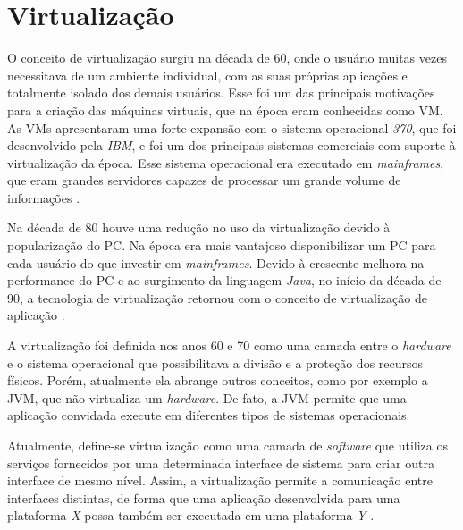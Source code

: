 \chapter{Virtualização}
\label{cap:virtualizacao}

O conceito de virtualização surgiu na década de 60, onde o usuário muitas vezes necessitava de um ambiente individual, com as suas próprias 
aplicações e totalmente isolado dos demais usuários. Esse foi um das principais motivações para a criação das máquinas virtuais, que na época 
eram conhecidas como \ac{VM}. As \acp{VM} apresentaram uma forte expansão com o sistema operacional \textit{370}, que foi 
desenvolvido pela \textit{IBM}, e foi um dos principais sistemas comerciais com suporte à virtualização da época. Esse sistema operacional 
era executado em \textit{mainframes}, que eram grandes servidores capazes de processar um grande volume de informações \cite{laureano2008}. 

Na década de 80 houve uma redução no uso da virtualização devido à popularização do \ac{PC}. Na época era mais vantajoso disponibilizar 
um \ac{PC} para cada usuário do que investir em \textit{mainframes}. Devido à crescente melhora na performance do \ac{PC} e
ao surgimento da linguagem \textit{Java}, no início da década de 90, a tecnologia de virtualização retornou com o conceito de virtualização
de aplicação \cite{laureano2008}.

A virtualização foi definida nos anos 60 e 70 como uma camada entre o \textit{hardware} e o sistema operacional que possibilitava a 
divisão e a proteção dos recursos físicos. Porém, atualmente ela abrange outros conceitos, como por exemplo a \ac{JVM}, que não virtualiza
um \textit{hardware}. De fato, a \ac{JVM} permite que uma aplicação convidada execute em diferentes tipos de sistemas operacionais.

Atualmente, define-se virtualização como uma camada de \textit{software} que utiliza os serviços fornecidos por uma determinada interface de 
sistema para criar outra interface de mesmo nível. Assim, a virtualização permite a comunicação entre interfaces distintas, de forma que uma 
aplicação desenvolvida para uma plataforma \textit{X} possa também ser executada em uma plataforma \textit{Y} \cite{laureano2008}.

